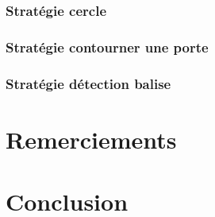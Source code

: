 \documentclass[12pt]{article}
\begin{document}
\subsubsection{Stratégie cercle}
\subsubsection{Stratégie contourner une porte}
\subsubsection{Stratégie détection balise}

\newpage

\section{Remerciements}

\newpage

\section{Conclusion}
\end{document}

